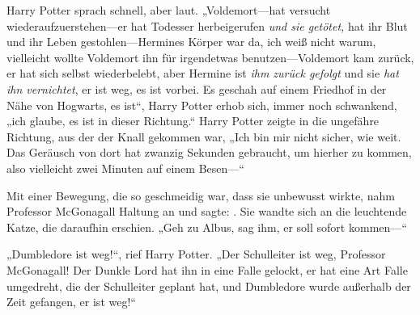 Harry Potter sprach schnell, aber laut.
„Voldemort—hat versucht wiederaufzuerstehen—er hat Todesser herbeigerufen \emph{und sie getötet,} hat ihr Blut und ihr Leben gestohlen—Hermines Körper war da, ich weiß nicht warum, vielleicht wollte Voldemort ihn für irgendetwas benutzen—Voldemort kam zurück, er hat sich selbst wiederbelebt, aber Hermine ist \emph{ihm zurück gefolgt} und sie \emph{hat ihn vernichtet}, er ist weg, es ist vorbei.
Es geschah auf einem Friedhof in der Nähe von Hogwarts, es ist“, Harry Potter erhob sich, immer noch schwankend, „ich glaube, es ist in dieser Richtung.“
Harry Potter zeigte in die ungefähre Richtung, aus der der Knall gekommen war,
„Ich bin mir nicht sicher, wie weit. Das Geräusch von dort hat zwanzig Sekunden gebraucht, um hierher zu kommen, also vielleicht zwei Minuten auf einem Besen—“

Mit einer Bewegung, die so geschmeidig war, dass sie unbewusst wirkte, nahm Professor McGonagall Haltung an und sagte: . Sie wandte sich an die leuchtende Katze, die daraufhin erschien.
„Geh zu Albus, sag ihm, er soll sofort kommen—“

„Dumbledore ist weg!“, rief Harry Potter. „Der Schulleiter ist weg, Professor McGonagall! Der Dunkle Lord hat ihn in eine Falle gelockt, er hat eine Art Falle umgedreht, die der Schulleiter geplant hat, und Dumbledore wurde außerhalb der Zeit gefangen, er ist weg!“

